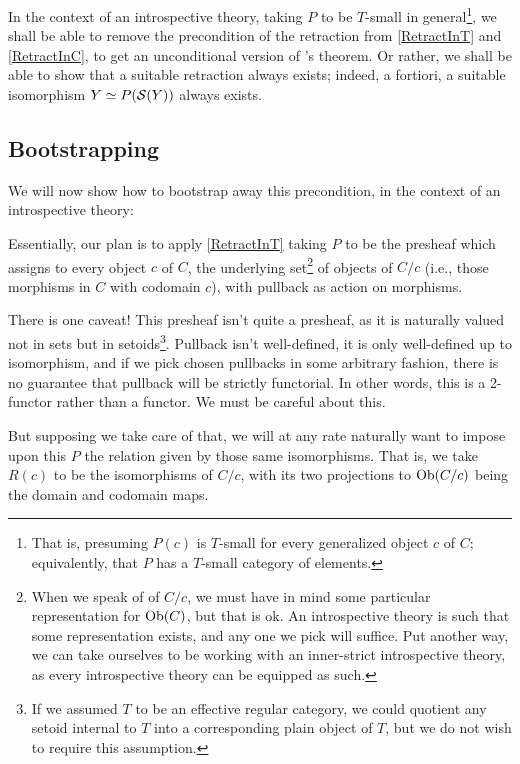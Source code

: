 In the context of an introspective theory, taking $P$ to be $T$-small in general\footnote{That is, presuming $P(c)$ is $T$-small for every generalized object $c$ of $C$; equivalently, that $P$ has a $T$-small category of elements.}, we shall be able to remove the precondition of the retraction from \cref{RetractInT} and \cref{RetractInC}, to get an unconditional version of \Loeb's theorem. Or rather, we shall be able to show that a suitable retraction always exists; indeed, a fortiori, a suitable isomorphism $Y \simeq P(\mathcal{S}(Y))$ always exists.

\subsection{Bootstrapping}
We will now show how to bootstrap away this precondition, in the context of an introspective theory:

Essentially, our plan is to apply \cref{RetractInT} taking $P$ to be the presheaf which assigns to every object $c$ of $C$, the underlying set\footnote{When we speak of  of $C/c$, we must have in mind some particular representation for $\operatorname{Ob}(C)$, but that is ok. An introspective theory is such that some representation exists, and any one we pick will suffice. Put another way, we can take ourselves to be working with an inner-strict introspective theory, as every introspective theory can be equipped as such.} of objects of $C/c$ (i.e., those morphisms in $C$ with codomain $c$), with pullback as action on morphisms.

There is one caveat! This presheaf isn't quite a presheaf, as it is naturally valued not in sets but in setoids\footnote{If we assumed $T$ to be an effective regular category, we could quotient any setoid internal to $T$ into a corresponding plain object of $T$, but we do not wish to require this assumption.}. Pullback isn't well-defined, it is only well-defined up to isomorphism, and if we pick chosen pullbacks in some arbitrary fashion, there is no guarantee that pullback will be strictly functorial. In other words, this is a 2-functor rather than a functor. We must be careful about this.

But supposing we take care of that, we will at any rate naturally want to impose upon this $P$ the relation given by those same isomorphisms. That is, we take $R(c)$ to be the isomorphisms of $C/c$, with its two projections to $\operatorname{Ob}(C/c)$ being the domain and codomain maps.

